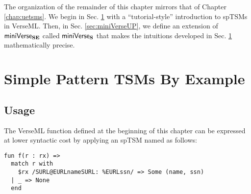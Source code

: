The organization of the remainder of this chapter mirrors that of Chapter \ref{chap:uetsms}. We begin in Sec. \ref{sec:ptsms-by-example} with a ``tutorial-style'' introduction to spTSMs in VerseML. 
Then, in Sec. \ref{sec:miniVerseUP}, we define an extension of $\mathsf{miniVerse}_\textbf{SE}$ called $\mathsf{miniVerse}_\textbf{S}$ that makes the intuitions developed in Sec. \ref{sec:ptsms-by-example} mathematically precise.

\section{Simple Pattern TSMs By Example}\label{sec:ptsms-by-example}

\subsection{Usage}\label{sec:ptsms-usage}
The VerseML function  defined at the beginning of this chapter can be expressed at lower syntactic cost by applying an spTSM named  as follows:
\begin{lstlisting}
fun f(r : rx) => 
  match r with 
    $rx /SURL@EURLnameSURL: %EURLssn/ => Some (name, ssn)
  | _ => None
  end
\end{lstlisting}
